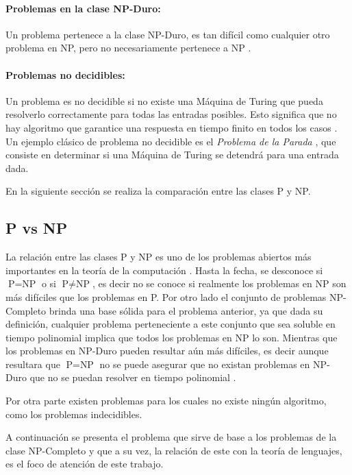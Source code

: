 \paragraph{Problemas en la clase NP-Duro:}
Un problema pertenece a la clase NP-Duro, es tan difícil como cualquier otro problema en NP, pero no 
necesariamente pertenece a NP \cite{authomataTheory}.  

\paragraph{Problemas no decidibles:}
Un problema es no decidible si no existe una Máquina de Turing que pueda resolverlo correctamente para todas las 
entradas posibles. Esto significa que no hay algoritmo que garantice una respuesta en tiempo finito en todos los 
casos \cite{authomataTheory}. Un ejemplo clásico de problema no decidible es el \textit{Problema de la Parada}
\cite{authomataTheory}, que consiste en determinar si una Máquina de Turing se detendrá para una entrada dada.

En la siguiente sección se realiza la comparación entre las clases P y NP.

\subsection{P vs NP}

La relación entre las clases P y NP es uno de los problemas abiertos más importantes en la teoría de la
computación \cite{authomataTheory}. Hasta la fecha, se desconoce si $\text{P} = \text{NP}$ o si $\text{P} \neq \text{NP}$,
es decir no se conoce si realmente los problemas en NP son más difíciles que los problemas en P. Por otro
lado el conjunto de problemas NP-Completo brinda una base sólida para el problema anterior, ya que dada su
definición, cualquier problema perteneciente a este conjunto que sea soluble en tiempo polinomial
implica que todos los problemas en NP lo son. Mientras que los problemas en NP-Duro pueden resultar aún más
difíciles, es decir aunque resultara que $\text{P} = \text{NP}$ no se puede asegurar que no existan problemas
en NP-Duro que no se puedan resolver en tiempo polinomial \cite{authomataTheory}.

Por otra parte existen problemas para los cuales no existe ningún algoritmo, como los problemas indecidibles.

A continuación se presenta el problema que sirve de base a los problemas de la clase NP-Completo y que a su
vez, la relación de este con la teoría de lenguajes, es el foco de atención de este trabajo.

